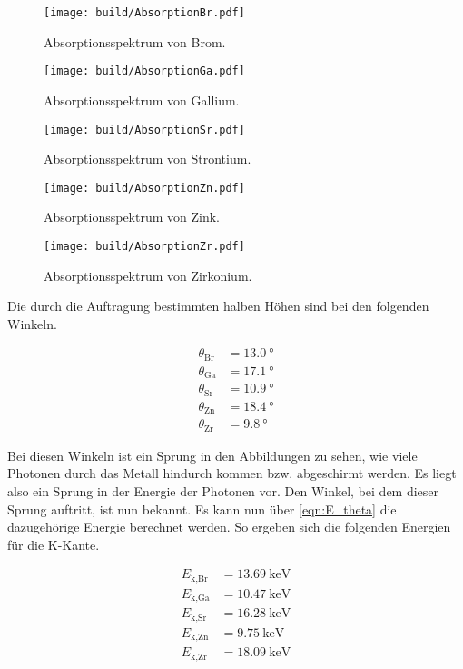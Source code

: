 \begin{figure}[H]
    \centering
    \texttt{[image: build/AbsorptionBr.pdf]}
    \caption{Absorptionsspektrum von Brom.}
\end{figure}

\begin{figure}[H]
    \centering
    \texttt{[image: build/AbsorptionGa.pdf]}
    \caption{Absorptionsspektrum von Gallium.}
\end{figure}

\begin{figure}[H]
    \centering
    \texttt{[image: build/AbsorptionSr.pdf]}
    \caption{Absorptionsspektrum von Strontium.}
\end{figure}

\begin{figure}[H]
    \centering
    \texttt{[image: build/AbsorptionZn.pdf]}
    \caption{Absorptionsspektrum von Zink.}
\end{figure}

\begin{figure}[H]
    \centering
    \texttt{[image: build/AbsorptionZr.pdf]}
    \caption{Absorptionsspektrum von Zirkonium.}
\end{figure}
    
\noindent Die durch die Auftragung bestimmten halben Höhen sind bei den folgenden Winkeln.

\begin{align*}
    \theta_\text{Br} &= \qty{13.0}{\degree}\\
    \theta_\text{Ga} &= \qty{17.1}{\degree}\\
    \theta_\text{Sr} &= \qty{10.9}{\degree}\\
    \theta_\text{Zn} &= \qty{18.4}{\degree}\\
    \theta_\text{Zr} &= \qty{9.8}{\degree}
\end{align*}

\noindent Bei diesen Winkeln ist ein Sprung in den Abbildungen zu sehen, wie viele Photonen durch das Metall hindurch kommen bzw. abgeschirmt 
werden. Es liegt also ein Sprung in der Energie der Photonen vor. Den Winkel, bei dem dieser Sprung auftritt, ist nun bekannt. Es kann nun über 
\autoref{eqn:E_theta} die dazugehörige Energie berechnet werden. So ergeben sich die folgenden Energien für die K-Kante.

\begin{align*}
    E_\text{k,Br} &= \qty{13.69}{\kilo \electronvolt}\\
    E_\text{k,Ga} &= \qty{10.47}{\kilo \electronvolt}\\
    E_\text{k,Sr} &= \qty{16.28}{\kilo \electronvolt}\\
    E_\text{k,Zn} &= \qty{9.75}{\kilo \electronvolt}\\
    E_\text{k,Zr} &= \qty{18.09}{\kilo \electronvolt}
\end{align*}

